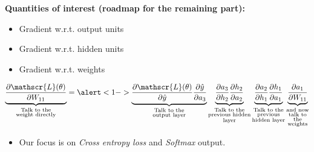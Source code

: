 \savestack{\nnoutputone}{}
\savestack{\nnoutputtwo}{}

\begin{frame}
\end{frame}

\begin{frame}
  \begin{overlayarea}{\textwidth}{\textheight}
    \textbf{Quantities of interest (roadmap for the remaining part):}
    \begin{itemize}
      \item \alert<1->{Gradient w.r.t. output units}
      \item Gradient w.r.t. hidden units
      \item Gradient w.r.t. weights
    \end{itemize}

    \begin{align*}
      \underbrace{\frac{\partial \mathscr{L}(\theta)}{\partial W_{11}}}_
      {\substack{\text{Talk to the}\\ \text{weight directly}}}
      =
      \alert<1->{\underbrace{\frac{\partial \mathscr{L}(\theta)}{\partial \hat{y}} \frac{\partial \hat{y}}{\partial a_{3}}}_
        {\substack{\text{Talk to the} \\ \text{output layer}}}}
      \underbrace{\frac{\partial a_{3}}{\partial h_{2}} \frac{\partial h_{2}}{\partial a_{2}}}_
      {\substack{\text{Talk to the} \\ \text{previous hidden} \\ \text{layer}}}
      \underbrace{\frac{\partial a_{2}}{\partial h_{1}} \frac{\partial h_{1}}{\partial a_{1}}}_
      {\substack{\text{Talk to the} \\ \text{previous} \\ \text{hidden layer}}}
      \underbrace{\frac{\partial a_{1}}{\partial W_{11}}}_
      {\substack{\text{and now} \\ \text{talk to} \\ \text{the} \\ \text{weights}}}
    \end{align*}
    \begin{itemize}
      \item Our focus is on \textit{Cross entropy loss} and \textit{Softmax} output.
    \end{itemize}

  \end{overlayarea}
\end{frame}

